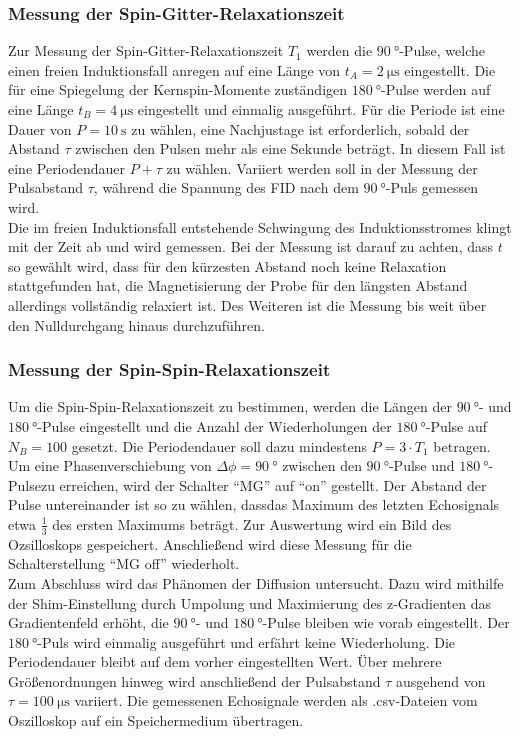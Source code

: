 \subsubsection{Messung der Spin-Gitter-Relaxationszeit}
Zur Messung der Spin-Gitter-Relaxationszeit $T_1$ werden die $\SI{90}{\degree}$-Pulse,
welche einen freien Induktionsfall anregen auf eine Länge von $t_A =
\SI{2}{\micro\second}$ eingestellt. Die für eine Spiegelung der Kernspin-Momente
zuständigen $\SI{180}{\degree}$-Pulse werden auf eine Länge $t_B =
\SI{4}{\micro\second}$ eingestellt und einmalig ausgeführt. Für die Periode ist eine
Dauer von $P = \SI{10}{\second}$ zu wählen, eine Nachjustage ist erforderlich,
sobald der Abstand $\tau$ zwischen den Pulsen mehr als eine Sekunde beträgt. In
diesem Fall ist eine Periodendauer $P + \tau$ zu wählen. Variiert werden soll in
der Messung der Pulsabstand $\tau$, während die Spannung des FID nach dem
$\SI{90}{\degree}$-Puls gemessen wird. \\
\noindent Die im freien Induktionsfall entstehende Schwingung des
Induktionsstromes klingt mit der Zeit ab und wird gemessen. Bei der Messung ist
darauf zu achten, dass $t$ so gewählt wird, dass für den kürzesten Abstand
noch keine Relaxation stattgefunden hat, die Magnetisierung der Probe für den
längsten Abstand allerdings vollständig relaxiert ist. Des Weiteren ist die
Messung bis weit über den Nulldurchgang hinaus durchzuführen. \\
\subsubsection{Messung der Spin-Spin-Relaxationszeit}
\noindent Um die Spin-Spin-Relaxationszeit zu bestimmen, werden die Längen der
$\SI{90}{\degree}$- und $\SI{180}{\degree}$-Pulse eingestellt und die Anzahl der
Wiederholungen der $\SI{180}{\degree}$-Pulse auf
$N_B = 100$ gesetzt. Die Periodendauer soll dazu mindestens $P = 3 \cdot T_1$
betragen. Um eine Phasenverschiebung von $\Delta \phi = \SI{90}{\degree}$
zwischen den $\SI{90}{\degree}$-Pulse und $\SI{180}{\degree}$-Pulsezu erreichen,
wird der Schalter \enquote{MG} auf
\enquote{on} gestellt. Der Abstand der Pulse untereinander ist so zu wählen,
dassdas Maximum des letzten Echosignals etwa $\frac{1}{3}$ des ersten Maximums
beträgt. Zur Auswertung wird ein Bild des Ozsilloskops gespeichert. Anschließend
wird diese Messung für die Schalterstellung \enquote{MG off} wiederholt. \\
\noindent Zum Abschluss wird das Phänomen der Diffusion untersucht. Dazu wird
mithilfe der Shim-Einstellung durch Umpolung  und Maximierung des z-Gradienten
das Gradientenfeld erhöht, die $\SI{90}{\degree}$- und $\SI{180}{\degree}$-Pulse
bleiben wie vorab eingestellt. Der $\SI{180}{\degree}$-Puls wird einmalig ausgeführt und erfährt
keine Wiederholung. Die Periodendauer bleibt auf dem vorher eingestellten Wert.
Über mehrere Größenordnungen hinweg wird anschließend der Pulsabstand $\tau$
ausgehend von $\tau = \SI{100}{\micro\second}$ variiert. Die gemessenen Echosignale
werden als .csv-Dateien vom Oszilloskop auf ein Speichermedium übertragen.
